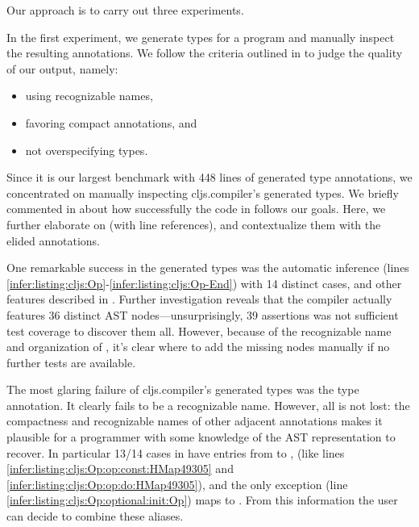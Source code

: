 Our approach is to carry out three experiments.

\label{infer:sec:experiment1}

In the first experiment, we generate types for
a program and manually inspect the resulting
annotations.
We follow the criteria 
outlined in 
to judge the quality of our output, namely:
\begin{itemize}
  \item using recognizable names,
  \item favoring compact annotations, and
  \item not overspecifying types.
\end{itemize}

Since it is our largest benchmark with 448 lines
of generated type annotations,
we concentrated on manually inspecting cljs.compiler's
generated types.
We briefly commented
in 
about how successfully the code in 
follows our goals.
Here, we further elaborate on 
(with line references), and contextualize them
with the elided annotations.

One remarkable success in the generated types
was the automatic inference  (lines \ref{infer:listing:cljs:Op}-\ref{infer:listing:cljs:Op-End})
with 14 distinct cases, and other features described in .
Further investigation reveals that
the compiler actually features 36 distinct AST nodes---unsurprisingly, 39 assertions was not sufficient
test coverage to discover them all.
However, because of the recognizable name and organization of
, it's clear where to add the missing nodes
manually if no further tests are available.

The most glaring failure of cljs.compiler's
generated types was the  type annotation.
It clearly fails to be a recognizable name.
However, all is not lost:
the compactness and recognizable names of other adjacent annotations
makes it plausible for a programmer with some
knowledge of the AST representation to 
recover.
In particular 13/14 cases in 
have entries from  to , 
(like lines \ref{infer:listing:cljs:Op:op:const:HMap49305} and \ref{infer:listing:cljs:Op:op:do:HMap49305}),
and the only exception (line \ref{infer:listing:cljs:Op:optional:init:Op})
maps to . From this information the user can
decide to combine these aliases.

